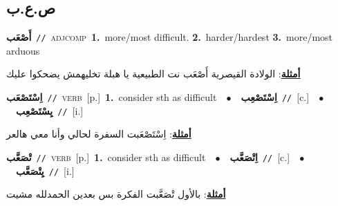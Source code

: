 \documentclass[10pt,a4paper,twoside]{article} %
\begin{document}
\begin{multicols}{2}
\vspace{-3mm}
\subsection*{\color{blue}\foreignlanguage{arabic}{ص.ع.ب}\color{blue}{}} 

{\setlength\topsep{0pt}\textbf{\foreignlanguage{arabic}{أَصْعَب}}\ {\color{gray}\texttt{//}\color{black}}\ \textsc{adj\textunderscore comp}\ \textbf{1.}~more/most difficult.  \textbf{2.}~harder/hardest  \textbf{3.}~more/most arduous\  \begin{flushright}\color{gray}\foreignlanguage{arabic}{\textbf{\underline{\foreignlanguage{arabic}{أمثلة}}}: الولادة القيصرية أَصْعَب نت الطبيعية يا هبلة تخليهمش يضحكوا عليك}\end{flushright}\color{black}} \vspace{2mm}

{\setlength\topsep{0pt}\textbf{\foreignlanguage{arabic}{اِسْتَصْعَب}}\ {\color{gray}\texttt{//}\color{black}}\ \textsc{verb}\ [p.]\ \textbf{1.}~consider sth as difficult\ \ $\bullet$\ \ \setlength\topsep{0pt}\textbf{\foreignlanguage{arabic}{اِسْتَصْعِب}}\ {\color{gray}\texttt{//}\color{black}}\ [c.]\ \ $\bullet$\ \ \setlength\topsep{0pt}\textbf{\foreignlanguage{arabic}{يِسْتَصْعِب}}\ {\color{gray}\texttt{//}\color{black}}\ [i.]\  \begin{flushright}\color{gray}\foreignlanguage{arabic}{\textbf{\underline{\foreignlanguage{arabic}{أمثلة}}}: اِسْتَصْعَبت السفرة لحالي وأنا معي هالعر}\end{flushright}\color{black}} \vspace{2mm}

{\setlength\topsep{0pt}\textbf{\foreignlanguage{arabic}{تْصَعَّب}}\ {\color{gray}\texttt{//}\color{black}}\ \textsc{verb}\ [p.]\ \textbf{1.}~consider sth as difficult\ \ $\bullet$\ \ \setlength\topsep{0pt}\textbf{\foreignlanguage{arabic}{اِتْصَعَّب}}\ {\color{gray}\texttt{//}\color{black}}\ [c.]\ \ $\bullet$\ \ \setlength\topsep{0pt}\textbf{\foreignlanguage{arabic}{يِتْصَعَّب}}\ {\color{gray}\texttt{//}\color{black}}\ [i.]\  \begin{flushright}\color{gray}\foreignlanguage{arabic}{\textbf{\underline{\foreignlanguage{arabic}{أمثلة}}}: بالأول تْصَعَّبت الفكرة بس بعدين الحمدلله مشيت}\end{flushright}\color{black}} \vspace{2mm}


\end{multicols}
\end{document}
